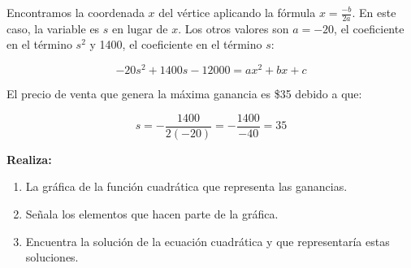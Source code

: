 \documentclass[12pt,a4paper]{article}
\begin{document}
Encontramos la coordenada $x$ del vértice aplicando la fórmula $x = \frac{-b}{2a}$. En este caso, la variable es $s$ en lugar de $x$. Los otros valores son $a = -20$, el coeficiente en el término $s^2$ y 1400, el coeficiente en el término $s$:

$$-20s^2 + 1400s - 12000 = ax^2 + bx + c$$

El precio de venta que genera la máxima ganancia es \$35 debido a que:

$$s = -\frac{1400}{2(-20)} = -\frac{1400}{-40} = 35$$

\textbf{Realiza:}
\begin{enumerate}
\item La gráfica de la función cuadrática que representa las ganancias.
\item Señala los elementos que hacen parte de la gráfica.
\item Encuentra la solución de la ecuación cuadrática y que representaría estas soluciones.
\end{enumerate}

\vspace{5mm} %
\end{document}
